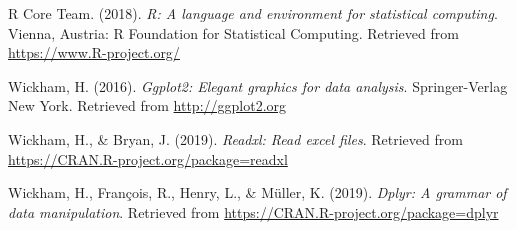 \documentclass[man,floatsintext]{apa6}
\begin{document}
\hypertarget{ref-R-base}{}
R Core Team. (2018). \emph{R: A language and environment for statistical
computing}. Vienna, Austria: R Foundation for Statistical Computing.
Retrieved from \url{https://www.R-project.org/}

\hypertarget{ref-R-ggplot2}{}
Wickham, H. (2016). \emph{Ggplot2: Elegant graphics for data analysis}.
Springer-Verlag New York. Retrieved from \url{http://ggplot2.org}

\hypertarget{ref-R-readxl}{}
Wickham, H., \& Bryan, J. (2019). \emph{Readxl: Read excel files}.
Retrieved from \url{https://CRAN.R-project.org/package=readxl}

\hypertarget{ref-R-dplyr}{}
Wickham, H., François, R., Henry, L., \& Müller, K. (2019). \emph{Dplyr:
A grammar of data manipulation}. Retrieved from
\url{https://CRAN.R-project.org/package=dplyr}

\endgroup
\end{document}
